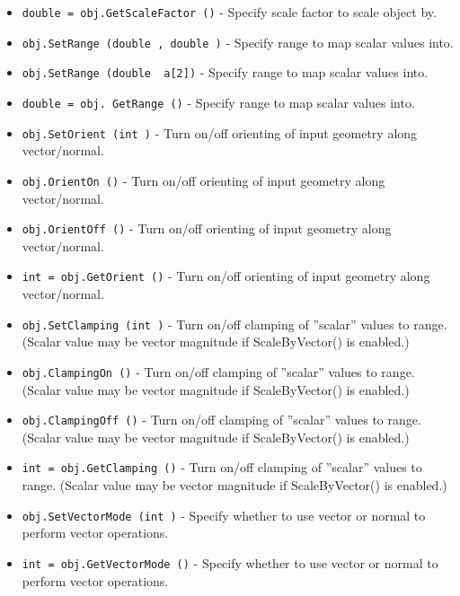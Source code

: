 \begin{itemize}
\item  \verb|double = obj.GetScaleFactor ()| -  Specify scale factor to scale object by.

\item  \verb|obj.SetRange (double , double )| -  Specify range to map scalar values into.

\item  \verb|obj.SetRange (double  a[2])| -  Specify range to map scalar values into.

\item  \verb|double = obj. GetRange ()| -  Specify range to map scalar values into.

\item  \verb|obj.SetOrient (int )| -  Turn on/off orienting of input geometry along vector/normal.

\item  \verb|obj.OrientOn ()| -  Turn on/off orienting of input geometry along vector/normal.

\item  \verb|obj.OrientOff ()| -  Turn on/off orienting of input geometry along vector/normal.

\item  \verb|int = obj.GetOrient ()| -  Turn on/off orienting of input geometry along vector/normal.

\item  \verb|obj.SetClamping (int )| -  Turn on/off clamping of ''scalar'' values to range. (Scalar value may be
  vector magnitude if ScaleByVector() is enabled.)

\item  \verb|obj.ClampingOn ()| -  Turn on/off clamping of ''scalar'' values to range. (Scalar value may be
  vector magnitude if ScaleByVector() is enabled.)

\item  \verb|obj.ClampingOff ()| -  Turn on/off clamping of ''scalar'' values to range. (Scalar value may be
  vector magnitude if ScaleByVector() is enabled.)

\item  \verb|int = obj.GetClamping ()| -  Turn on/off clamping of ''scalar'' values to range. (Scalar value may be
  vector magnitude if ScaleByVector() is enabled.)

\item  \verb|obj.SetVectorMode (int )| -  Specify whether to use vector or normal to perform vector operations.

\item  \verb|int = obj.GetVectorMode ()| -  Specify whether to use vector or normal to perform vector operations.


\end{itemize}
